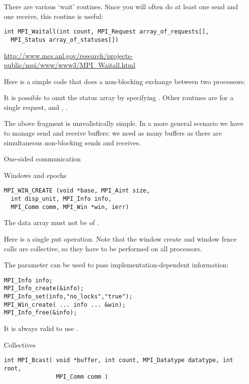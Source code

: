 There are various `wait' routines. Since you will often do at least
one send and one receive, this routine is useful:
\begin{verbatim}
int MPI_Waitall(int count, MPI_Request array_of_requests[], 
  MPI_Status array_of_statuses[])
\end{verbatim}
\url{http://www.mcs.anl.gov/research/projects-public/mpi/www/www3/MPI_Waitall.html}

Here is a simple code that does a non-blocking exchange between two processors:

It is possible to omit the status array by specifying .
Other routines are  for a single request, and
, .

The above fragment is unrealistically simple. In a more general scenario we
have to manage send and receive buffers: we need as many buffers as there are
simultaneous non-blocking sends and receives.

 {One-sided communication}

 {Windows and epochs}

\begin{verbatim}
MPI_WIN_CREATE (void *base, MPI_Aint size, 
  int disp_unit, MPI_Info info, 
  MPI_Comm comm, MPI_Win *win, ierr)
\end{verbatim}
The data array must not be  of .

Here is a single put operation. Note that the window create and window fence calls
are collective, so they have to be performed on all processors.

The  parameter can be used to pass implementation-dependent 
information:
\begin{verbatim}
MPI_Info info;
MPI_Info_create(&info);
MPI_Info_set(info,"no_locks","true");
MPI_Win_create( ... info ... &win);
MPI_Info_free(&info);
\end{verbatim}
It is always valid to use .

 {Collectives}

\begin{verbatim}
int MPI_Bcast( void *buffer, int count, MPI_Datatype datatype, int root, 
               MPI_Comm comm )
\end{verbatim}

